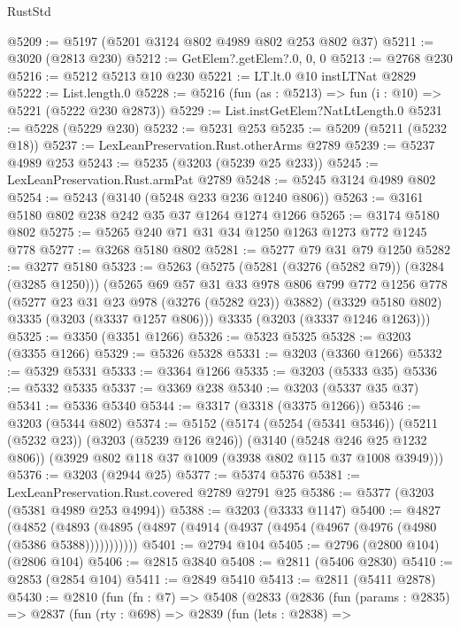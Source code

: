 \begin{lexlean}{RustStd}
\begin{coremodule}
@5209 := @5197 (@5201 @3124 @802 @4989 @802 @253 @802 @37)
@5211 := @3020 (@2813 @230)
@5212 := GetElem?.getElem?.{0, 0, 0}
@5213 := @2768 @230
@5216 := @5212 @5213 @10 @230
@5221 := LT.lt.{0} @10 instLTNat @2829
@5222 := List.length.{0}
@5228 := @5216 (fun (as : @5213) => fun (i : @10) => @5221 (@5222 @230 @2873))
@5229 := List.instGetElem?NatLtLength.{0}
@5231 := @5228 (@5229 @230)
@5232 := @5231 @253
@5235 := @5209 (@5211 (@5232 @18))
@5237 := LexLeanPreservation.Rust.otherArms @2789
@5239 := @5237 @4989 @253
@5243 := @5235 (@3203 (@5239 @25 @233))
@5245 := LexLeanPreservation.Rust.armPat @2789
@5248 := @5245 @3124 @4989 @802
@5254 := @5243 (@3140 (@5248 @233 @236 @1240 @806))
@5263 := @3161 @5180 @802 @238 @242 @35 @37 @1264 @1274 @1266
@5265 := @3174 @5180 @802
@5275 := @5265 @240 @71 @31 @34 @1250 @1263 @1273 @772 @1245 @778
@5277 := @3268 @5180 @802
@5281 := @5277 @79 @31 @79 @1250
@5282 := @3277 @5180
@5323 := @5263
    (@5275
      (@5281 (@3276 (@5282 @79)) (@3284 (@3285 @1250)))
      (@5265
        @69
        @57
        @31
        @33
        @978
        @806
        @799
        @772
        @1256
        @778
        (@5277 @23 @31 @23 @978 (@3276 (@5282 @23)) @3882)
        (@3329 @5180 @802)
        @3335
        (@3203 (@3337 @1257 @806)))
      @3335
      (@3203 (@3337 @1246 @1263)))
@5325 := @3350 (@3351 @1266)
@5326 := @5323 @5325
@5328 := @3203 (@3355 @1266)
@5329 := @5326 @5328
@5331 := @3203 (@3360 @1266)
@5332 := @5329 @5331
@5333 := @3364 @1266
@5335 := @3203 (@5333 @35)
@5336 := @5332 @5335
@5337 := @3369 @238
@5340 := @3203 (@5337 @35 @37)
@5341 := @5336 @5340
@5344 := @3317 (@3318 (@3375 @1266))
@5346 := @3203 (@5344 @802)
@5374 := @5152
    (@5174
      (@5254 (@5341 @5346))
      (@5211 (@5232 @23))
      (@3203 (@5239 @126 @246))
      (@3140 (@5248 @246 @25 @1232 @806))
      (@3929 @802 @118 @37 @1009 (@3938 @802 @115 @37 @1008 @3949)))
@5376 := @3203 (@2944 @25)
@5377 := @5374 @5376
@5381 := LexLeanPreservation.Rust.covered @2789 @2791 @25
@5386 := @5377 (@3203 (@5381 @4989 @253 @4994))
@5388 := @3203 (@3333 @1147)
@5400 := @4827
    (@4852 (@4893 (@4895 (@4897 (@4914 (@4937 (@4954 (@4967 (@4976 (@4980 (@5386 @5388)))))))))))
@5401 := @2794 @104
@5405 := @2796 (@2800 @104) (@2806 @104)
@5406 := @2815 @3840
@5408 := @2811 (@5406 @2830)
@5410 := @2853 (@2854 @104)
@5411 := @2849 @5410
@5413 := @2811 (@5411 @2878)
@5430 := @2810
    (fun (fn : @7) =>
    @5408
      (@2833
        (@2836
          (fun (params : @2835) =>
          @2837
            (fun (rty : @698) =>
            @2839
              (fun (lets : @2838) =>

\end{coremodule}
\end{lexlean}
